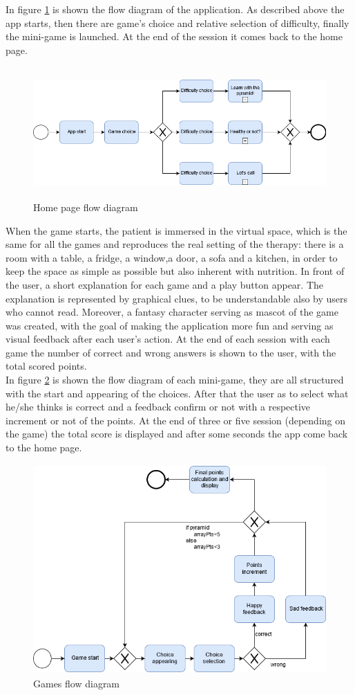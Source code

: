 In figure \ref{fig:homeflow} is shown the flow diagram of the application. As described above the app starts, then there are game's choice and relative selection of difficulty, finally the mini-game is launched. At the end of the session it comes back to the home page.
\begin{figure}[H]
\centering
\includegraphics[width=15cm, height=5cm]{immagini/flow1.png}
\caption{Home page flow diagram}\label{fig:homeflow}
\end{figure}
When the game starts, the patient is immersed in the virtual space, which is the same for all the games and reproduces the real setting of the therapy: there is a room with a table, a fridge, a window,a door, a sofa and a kitchen, in order to keep the space as simple as possible but also inherent with nutrition. In front of the user, a short explanation for each game and a play button appear. The explanation is represented by graphical clues, to be understandable also by users who cannot read. Moreover, a fantasy character serving as mascot of the game was created, with the goal of making the application more fun and serving as visual feedback after each user's action. At the end of each session with each game the number of correct and wrong answers is shown to the user, with the total scored points.\\
In figure \ref{fig:gameflow} is shown the flow diagram of each mini-game, they are all structured with the start and appearing of the choices. After that the user as to select what he/she thinks is correct and a feedback confirm or not with a respective increment or not of the points. At the end of three or five session (depending on the game) the total score is displayed and after some seconds the app come back to the home page.
\begin{figure}[H]
\centering
\includegraphics[width=15cm, height=8cm]{immagini/flow2.png}
\caption{Games flow diagram}\label{fig:gameflow}
\end{figure}
